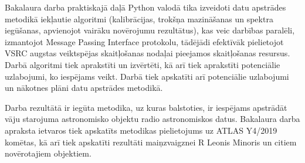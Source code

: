 \documentclass[12pt,paper=a4]{report}
\begin{document}
Bakalaura darba praktiskajā daļā Python valodā tika izveidoti datu apstrādes metodikā iekļautie algoritmi (kalibrācijas, trokšņa mazināšanas un spektra iegūšanas, apvienojot vairāku novērojumu rezultātus), kas veic darbības paralēli, izmantojot Message Passing Interface protokolu, tādējādi efektīvāk pielietojot VSRC augstas veiktspējas skaitļošanas nodaļai pieejamos skaitļošanas resursus. Darbā algoritmi tiek aprakstīti un izvērtēti, kā arī tiek aprakstīti potenciālie uzlabojumi, ko iespējams veikt. Darbā tiek apskatīti arī potenciālie uzlabojumi un nākotnes plāni datu apstrādes metodikā.


Darba rezultātā ir iegūta metodika, uz kuras balstoties, ir iespējams apstrādāt vāju starojuma astronomisko objektu radio astronomiskos datus. Bakalaura darba apraksta ietvaros tiek apskatīts metodikas pielietojums uz ATLAS Y4/2019 komētas, kā arī tiek apskatīti rezultāti maiņzvaigznei R Leonis Minoris un citiem novērotajiem objektiem.









\end{document}
